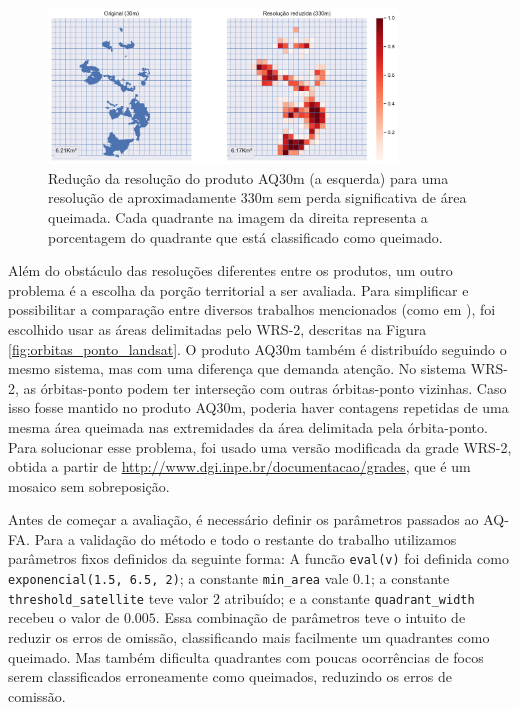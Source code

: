 \documentclass[cic,tc]{iiufrgs}
\begin{document}
\begin{figure}[H]
    \caption{Redução da resolução do produto AQ30m (a esquerda) para uma resolução de aproximadamente 330m sem perda significativa de área queimada. Cada quadrante na imagem da direita representa a porcentagem do quadrante que está classificado como queimado.}
    \begin{center}
        \includegraphics[width=25em]{resolução_continua}
    \end{center}
    \label{fig:resolução_continua}
\end{figure}

Além do obstáculo das resoluções diferentes entre os produtos, um outro problema é a escolha da porção territorial a ser avaliada. Para simplificar e possibilitar a comparação entre diversos trabalhos mencionados (como em \citet{libonati2015algorithm}), foi escolhido usar as áreas delimitadas pelo WRS-2, descritas na Figura \ref{fig:orbitas_ponto_landsat}. O produto AQ30m também é distribuído seguindo o mesmo sistema, mas com uma diferença que demanda atenção. No sistema WRS-2, as órbitas-ponto podem ter interseção com outras órbitas-ponto vizinhas. Caso isso fosse mantido no produto AQ30m, poderia haver contagens repetidas de uma mesma área queimada nas extremidades da área delimitada pela órbita-ponto. Para solucionar esse problema, foi usado uma versão modificada da grade WRS-2, obtida a partir de \url{http://www.dgi.inpe.br/documentacao/grades}, que é um mosaico sem sobreposição.

Antes de começar a avaliação, é necessário definir os parâmetros passados ao AQ-FA. Para a validação do método e todo o restante do trabalho utilizamos parâmetros fixos definidos da seguinte forma: A funcão \texttt{eval(v)} foi definida como \texttt{exponencial(1.5, 6.5, 2)}; a constante \texttt{min\_area} vale $0.1$; a constante \texttt{threshold\_satellite} teve valor $2$ atribuído; e a constante \texttt{quadrant\_width} recebeu o valor de $0.005$. Essa combinação de parâmetros teve o intuito de reduzir os erros de omissão, classificando mais facilmente um quadrantes como queimado. Mas também dificulta quadrantes com poucas ocorrências de focos serem classificados erroneamente como queimados, reduzindo os erros de comissão.
\end{document}
